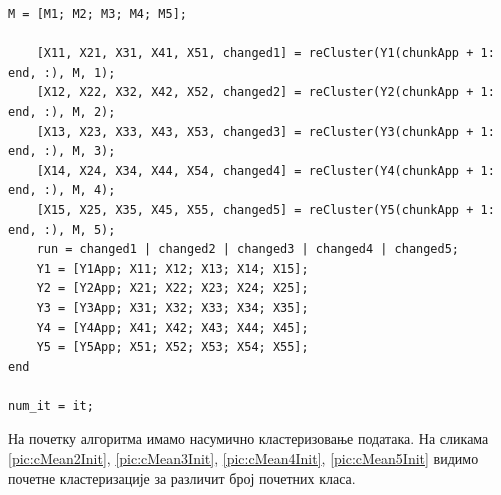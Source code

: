 \begin{lstlisting}[caption={C-Mean функција},label={fun:cMean}]
    M = [M1; M2; M3; M4; M5];
    
    [X11, X21, X31, X41, X51, changed1] = reCluster(Y1(chunkApp + 1: end, :), M, 1);
    [X12, X22, X32, X42, X52, changed2] = reCluster(Y2(chunkApp + 1: end, :), M, 2);
    [X13, X23, X33, X43, X53, changed3] = reCluster(Y3(chunkApp + 1: end, :), M, 3);
    [X14, X24, X34, X44, X54, changed4] = reCluster(Y4(chunkApp + 1: end, :), M, 4);
    [X15, X25, X35, X45, X55, changed5] = reCluster(Y5(chunkApp + 1: end, :), M, 5);
    run = changed1 | changed2 | changed3 | changed4 | changed5;
    Y1 = [Y1App; X11; X12; X13; X14; X15];
    Y2 = [Y2App; X21; X22; X23; X24; X25];
    Y3 = [Y3App; X31; X32; X33; X34; X35];
    Y4 = [Y4App; X41; X42; X43; X44; X45];
    Y5 = [Y5App; X51; X52; X53; X54; X55];
end

num_it = it;
\end{lstlisting}

 На почетку алгоритма имамо насумично кластеризовање података.  На сликама  \ref{pic:cMean2Init}, \ref{pic:cMean3Init}, \ref{pic:cMean4Init}, \ref{pic:cMean5Init} видимо почетне кластеризације за различит број почетних класа. 
 
